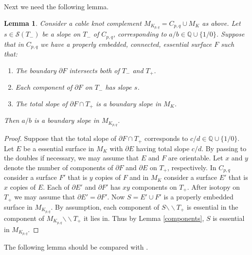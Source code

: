 \documentclass[11pt]{amsart}
\newtheorem{lemma}[theorem]{Lemma}
\theoremstyle{definition}
\newcommand{\QQ}{{\mathbb{Q}}}
\newcommand{\M}{M_{K_{p,q}}}
\newcommand{\cut}{{\backslash \backslash}}
\newcommand{\C}{{C_{p, q}}}
\begin{document}
Next we need the following lemma.


\begin{lemma} \label{glue} Consider  a cable knot complement $\M=\C\cup M_K$  as above.
Let $s\in \mathcal {S}(T_{-})$ be a slope on  $T_{-}$ of $\C$, corresponding to $a/b\in {\QQ}\cup \{ 1/0\}$.
Suppose that in $\C$ we have a properly embedded, connected, essential surface $F$ such that:
\begin{enumerate}
\item The boundary $\partial F$ intersects both of $T_{-}$ and $T_{+}$.

\item  Each component of $\partial F$ on $T_{-}$ has  slope $s$.

\item The total slope of $\partial F\cap T_{+}$ is a boundary slope
in $M_K$.
\end{enumerate}

Then $a/b$ is a boundary slope in $\M$.

\end{lemma}
\begin{proof}  
Suppose that the total slope of $\partial F\cap T_{+}$  corresponds to 
$c/d\in {\QQ}\cup \{ 1/0\}$.
Let $E$ be a essential surface in $M_K$ with  $\partial E$ having  total slope $c/d$.
By passing to the doubles if necessary, we may assume that $E$ and $F$ are orientable.
Let $x$ and $y$  denote the number of components of $\partial F$  and $\partial E$ on $T_{+}$, respectively.
In $\C$ consider a surface $F'$ that is  $y$ copies of  $F$ and in $M_K$ consider a surface $E'$ that is $x$ copies of
$E$. Each of $\partial E'$ and $\partial F'$ has $xy$ components on $T_{+}$.  After isotopy on $T_{+}$ we may assume that $\partial E'=\partial F'$. Now $S=E'\cup F'$ is a properly embedded surface in $\M$.
By assumption, each  component of $S \cut T_{+}$ is essential in the component of $\M \cut T_{+}$ it lies in. Thus  
by Lemma \ref{components}, $S$ is essential in $\M$.
\end{proof}



The following lemma  should be compared with
 \cite[Lemma 2.3]{KS}.
\end{document}
